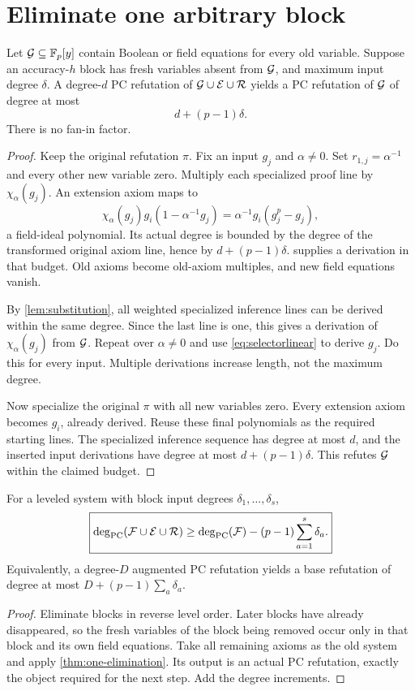 \section{Eliminate one arbitrary block}
\begin{theorem}\label{thm:one-elimination}
Let $\mathcal G\subseteq\mathbb F_p[y]$ contain Boolean or field equations for every old variable. Suppose an accuracy-$h$ block has fresh variables absent from $\mathcal G$, and maximum input degree $\delta$. A degree-$d$ PC refutation of $\mathcal G\cup\mathcal E\cup\mathcal R$ yields a PC refutation of $\mathcal G$ of degree at most
\[
 \boxed{d+(p-1)\delta.}
\]
There is no fan-in factor.
\end{theorem}
\begin{proof}
Keep the original refutation $\pi$. Fix an input $g_j$ and $\alpha\ne0$. Set $r_{1,j}=\alpha^{-1}$ and every other new variable zero. Multiply each specialized proof line by $\chi_\alpha(g_j)$. An extension axiom maps to
\[
 \chi_\alpha(g_j)g_i(1-\alpha^{-1}g_j)
 =\alpha^{-1}g_i(g_j^p-g_j),
\]
a field-ideal polynomial. Its actual degree is bounded by the degree of the transformed original axiom line, hence by $d+(p-1)\delta$.  supplies a derivation in that budget. Old axioms become old-axiom multiples, and new field equations vanish.

By \cref{lem:substitution}, all weighted specialized inference lines can be derived within the same degree. Since the last line is one, this gives a derivation of $\chi_\alpha(g_j)$ from $\mathcal G$. Repeat over $\alpha\ne0$ and use \eqref{eq:selectorlinear} to derive $g_j$. Do this for every input. Multiple derivations increase length, not the maximum degree.

Now specialize the original $\pi$ with all new variables zero. Every extension axiom becomes $g_i$, already derived. Reuse these final polynomials as the required starting lines. The specialized inference sequence has degree at most $d$, and the inserted input derivations have degree at most $d+(p-1)\delta$. This refutes $\mathcal G$ within the claimed budget.
\end{proof}

\begin{theorem}\label{thm:additive}
For a leveled system with block input degrees $\delta_1,\ldots,\delta_s$,
\[
 \boxed{\deg_{\mathrm{PC}}(\mathcal F\cup\mathcal E\cup\mathcal R)
 \ge\deg_{\mathrm{PC}}(\mathcal F)-(p-1)\sum_{a=1}^s\delta_a.}
\]
Equivalently, a degree-$D$ augmented PC refutation yields a base refutation of degree at most $D+(p-1)\sum_a\delta_a$.
\end{theorem}
\begin{proof}
Eliminate blocks in reverse level order. Later blocks have already disappeared, so the fresh variables of the block being removed occur only in that block and its own field equations. Take all remaining axioms as the old system and apply \cref{thm:one-elimination}. Its output is an actual PC refutation, exactly the object required for the next step. Add the degree increments.
\end{proof}

